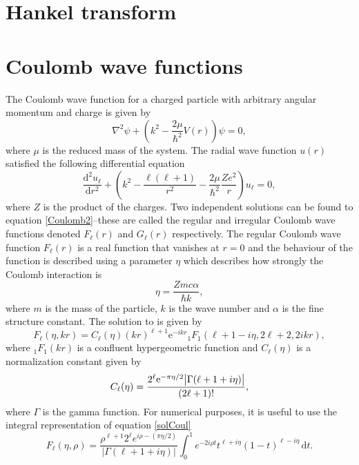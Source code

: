 \section{Hankel transform}
\section{Coulomb wave functions}
The Coulomb wave function for a charged particle with arbitrary angular momentum and charge is given by 
\begin{equation} \label{Coulomb1}
	\nabla^2\psi +\left( k^2-\frac{2\mu}{\hbar^2}V(r)\right)\psi = 0,
\end{equation}
where $\mu$ is the reduced mass of the system. The radial wave function $u(r)$ satisfied the following differential equation
\begin{equation} \label{Coulomb2}
	\frac{\text{d}^2 u_\ell}{\text{d}r^2}+\left( k^2-\frac{\ell(\ell+1)}{r^2}-\frac{2\mu}{\hbar^2}\frac{Ze^2}{r}\right)u_\ell=0,
\end{equation}
where $Z$ is the product of the charges. Two independent solutions can be found to equation \eqref{Coulomb2}--these are called the regular and irregular Coulomb wave functions denoted $F_\ell(r)$ and $G_\ell(r)$ respectively. The regular Coulomb wave function $F_\ell(r)$ is a real function that vanishes at $r=0$ and the behaviour of the function is described using a parameter $\eta$ which describes how strongly the Coulomb interaction is
\begin{equation} \label{etafactor}
	\eta = \frac{Zmc\alpha }{\hbar k},
\end{equation}
where $m$ is the mass of the particle, $k$ is the wave number and $\alpha$ is the fine structure constant. The solution to is given by
\begin{equation} \label{solCoul}
	F_\ell(\eta,kr) = C_\ell (\eta) (kr)^{\ell+1}\text{e}^{-ikr}  {}_1 F_1(\ell+1-i\eta,2\ell+2,2ikr),
\end{equation}
where ${}_1F_1(kr)$ is a confluent hypergeometric function and $C_\ell(\eta)$ is a normalization constant given by 
\begin{equation} \label{normalization}
	C_\ell(\eta) = \frac{2^\ell \text{e}^{-\pi\eta/2}\abs{\Gamma(\ell+1+i\eta)}}{(2\ell+1)!},
\end{equation}
where $\Gamma$ is the gamma function. For numerical purposes, it is useful to use the integral representation of equation \eqref{solCoul} \cite[eq. 33.7.1]{NIST} 
\begin{equation} \label{integralrep}
	F_\ell(\eta,\rho) = \frac{\rho^{\ell+1}2^\ell e^{i\rho-(\pi\eta/2)}}{|\Gamma(\ell+1+i\eta)|} \int_0^1 e^{-2i\rho t}t^{\ell+i\eta}(1-t)^{\ell-i\eta} \, \text{d}t.
\end{equation}
